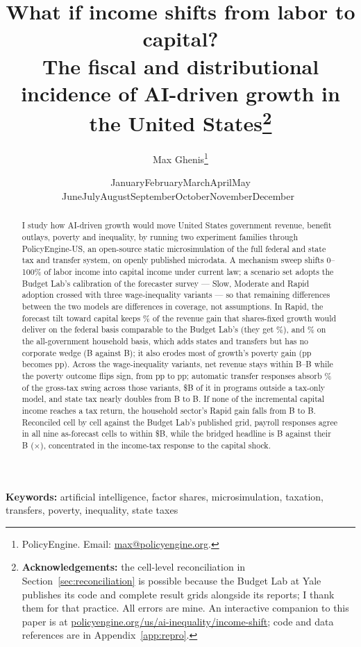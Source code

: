 \documentclass[11pt]{article}
\title{\bfseries What if income shifts from labor to capital?\\[0.15cm]
The fiscal and distributional incidence of AI-driven growth in the United
States\thanks{\textbf{Acknowledgements:} the cell-level reconciliation in
Section~\ref{sec:reconciliation} is possible because the Budget Lab at Yale
publishes its code and complete result grids alongside its reports; I thank
them for that practice. All errors are mine. An interactive companion to this
paper is at
\href{https://policyengine.org/us/ai-inequality/income-shift}{policyengine.org/us/ai-inequality/income-shift};
code and data references are in Appendix~\ref{app:repro}.}\\[0.7cm]}
\author{Max Ghenis\thanks{PolicyEngine. Email:
\href{mailto:max@policyengine.org}{max@policyengine.org}.}}
\date{\small \ifcase\month\or January\or February\or March\or April\or May\or
June\or July\or August\or September\or October\or November\or December\fi\
\the\year}
\begin{document}
\maketitle

\begin{abstract}
\noindent I study how AI-driven growth would move United States government
revenue, benefit outlays, poverty and inequality, by running two experiment
families through PolicyEngine-US, an open-source static microsimulation of the
full federal and state tax and transfer system, on openly published microdata.
A mechanism sweep shifts 0--100\% of labor income into capital income under
current law; a scenario set adopts the Budget Lab's calibration of the
\citet{karger2026} forecaster survey --- Slow, Moderate and Rapid adoption
crossed with three wage-inequality variants --- so that remaining differences
between the two models are differences in coverage, not assumptions. In Rapid,
the forecast tilt toward capital keeps \genKeptMatchedRapidPct\% of the
revenue gain that shares-fixed growth would deliver on the federal basis
comparable to the Budget Lab's (they get \genKeptTheirsRapidPct\%), and
\genKeptHouseholdRapidPct\% on the all-government household basis, which
adds states and transfers but has no corporate wedge
(\genRapidPropRev B against \genRapidFixedRev B); it also erodes most of
growth's poverty gain (\genRapidFixedPovPp pp becomes
\genRapidPropPovPp pp). Across the wage-inequality variants, net revenue
stays within \genRapidCompRev B--\genRapidExpRev B while the poverty outcome
flips sign, from \genRapidCompPovPp pp to \genRapidExpPovPp pp; automatic
transfer responses absorb \genTransferAbsorbPct\% of the gross-tax swing
across those variants, \$\genBenefitSwing B of it in programs outside a
tax-only model, and state tax nearly doubles from \genRapidCompState B to
\genRapidExpState B. If none of the incremental capital income reaches a tax
return, the household sector's Rapid gain falls from \genRealFullRev B to
\genRealZeroRev B. Reconciled cell by cell against the
Budget Lab's published grid, payroll responses agree in all nine as-forecast
cells to within \$\genPayrollMaxCellGap B, while the bridged headline is
\genBridgeOursTotal B against their \genBridgeTheirsTotal B
(\genBridgeRatio$\times$), concentrated in the income-tax response to the
capital shock.
\end{abstract}

\medskip
\noindent\textbf{Keywords:} artificial intelligence, factor shares,
microsimulation, taxation, transfers, poverty, inequality, state taxes
\end{document}
